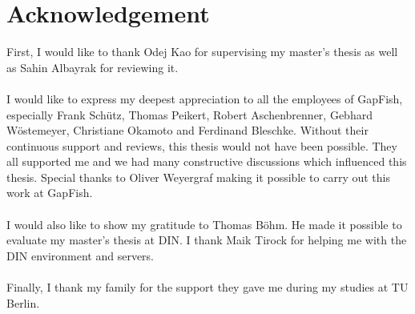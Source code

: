 \section*{Acknowledgement}

First, I would like to thank Odej Kao for supervising my master's
thesis as well as Sahin Albayrak for reviewing it.
\\\\
I would like to express my deepest appreciation to all the employees
of GapFish, especially Frank Schütz, Thomas Peikert, Robert
Aschenbrenner, Gebhard Wöstemeyer, Christiane Okamoto and Ferdinand
Bleschke. Without their continuous support and reviews, this thesis
would not have been possible. They all supported me and we had many
constructive discussions which influenced this thesis. Special thanks
to Oliver Weyergraf making it possible to carry out this work at
GapFish.
\\\\
I would also like to show my gratitude to Thomas Böhm. He made it
possible to evaluate my master's thesis at DIN. I thank Maik Tirock for
helping me with the DIN environment and servers.
\\\\
Finally, I thank my family for the support they gave me during
my studies at TU Berlin.
\clearpage
